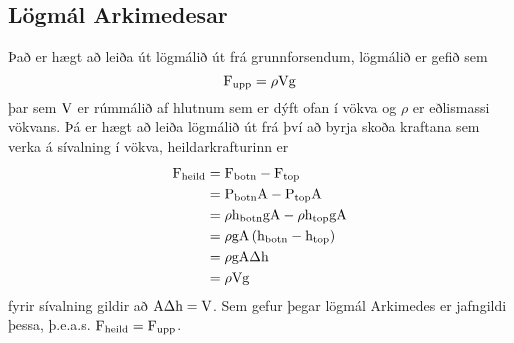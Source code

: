 \subsection{Lögmál Arkimedesar}
Það er hægt að leiða út lögmálið út frá grunnforsendum, lögmálið er gefið sem
\begin{equation}
	\textrm{F}_\text{upp} = \rho \text{V} \textrm{g}
\end{equation}
þar sem $\text{V}$ er rúmmálið af hlutnum sem er dýft ofan í vökva og $\rho$ er
eðlismassi vökvans. Þá er hægt að leiða lögmálið út frá því að byrja skoða kraftana
sem verka á sívalning í vökva, heildarkrafturinn er
\begin{align*}
	\textrm{F}_\text{heild} 
		&= \textrm{F}_\text{botn} - \textrm{F}_\text{top} \\
		&= \text{P}_\text{botn} \text{A} - \text{P}_\text{top} \text{A} \\
		&= \rho \textrm{h}_\text{botn} \textrm{g} \text{A} - \rho \textrm{h}_\text{top} \textrm{g} \text{A} \\
		&= \rho \textrm{g} \text{A} \left( \textrm{h}_\text{botn} - \textrm{h}_\text{top} \right)\\
		&= \rho \textrm{g} \text{A} \Delta \textrm{h} \\
		&= \rho \text{V} \textrm{g}
\end{align*}
fyrir sívalning gildir að $\text{A} \Delta \textrm{h} = \text{V}$. Sem gefur þegar
lögmál Arkimedes er jafngildi þessa, þ.e.a.s. 
$\textrm{F}_\text{heild} = \textrm{F}_\text{upp}$.


